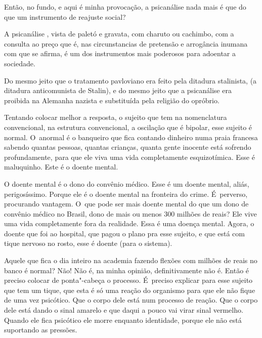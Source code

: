 

Então, no fundo, e aqui é minha provocação, a psicanálise nada mais é
que do que um instrumento de reajuste social?

 

A psicanálise , vista de paletó e gravata, com charuto ou cachimbo, com
a consulta ao preço que é, nas circunstancias de pretensão e arrogância
inumana com que se afirma, é um dos instrumentos mais poderosos para
adoentar a sociedade.

 

Do mesmo jeito que o tratamento pavloviano era feito pela ditadura
stalinista, (a ditadura anticomunista de Stalin), e do mesmo jeito que a
psicanálise era proibida na Alemanha nazista e substituída pela religião
do opróbrio.

 

Tentando colocar melhor a resposta, o sujeito que tem na nomenclatura
convencional, na estrutura convencional, a oscilação que é bipolar, esse
sujeito é normal. O~anormal é o banqueiro que fica contando dinheiro
numa praia francesa sabendo quantas pessoas, quantas crianças, quanta
gente inocente está sofrendo profundamente, para que ele viva uma vida
completamente esquizotímica. Esse é maluquinho. Este é o doente mental.

 

O doente mental é o dono do convênio médico. Esse é um doente mental,
aliás, perigosíssimo. Porque ele é o doente mental na fronteira do
crime. É~perverso, procurando vantagem. O~que pode ser mais doente
mental do que um dono de convênio médico no Brasil, dono de mais ou
menos 300 milhões de reais? Ele vive uma vida completamente fora da
realidade. Essa é uma doença mental. Agora, o doente que foi ao
hospital, que pagou o plano pra esse sujeito, e que está com tique
nervoso no rosto, esse é doente (para o sistema).

 

Aquele que fica o dia inteiro na academia fazendo flexões com milhões de
reais no banco é normal? Não! Não é, na minha opinião, definitivamente
não é. Então é preciso colocar de ponta"-cabeça o processo. É~preciso
explicar para esse sujeito que tem um tique, que esta é só uma reação do
organismo para que ele não fique de uma vez psicótico. Que o corpo dele
está num processo de reação. Que o corpo dele está dando o sinal amarelo
e que daqui a pouco vai virar sinal vermelho. Quando ele fica psicótico
ele morre enquanto identidade, porque ele não está suportando as
pressões.

